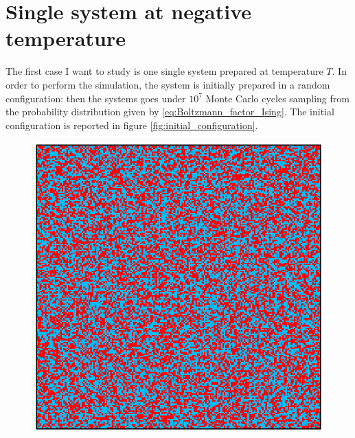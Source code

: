 \section{Single system at negative temperature}
The first case I want to study is one single system prepared at temperature $T$. In order to perform the simulation, the system is initially prepared in a random configuration: then the systems goes under $10^7$ Monte Carlo cycles 
sampling from the probability distribution given by \ref{eq:Boltzmann_factor_Ising}. The initial configuration is reported in figure \ref{fig:initial_configuration}. \\
\begin{figure}
    \centering 
    \begin{minipage}[c]{0.45\textwidth}
        \centering
        \includegraphics[scale=0.38]{./images/ising/initconf.eps}
    \end{minipage}
    \begin{minipage}[c]{0.45\textwidth}
        \centering

\end{minipage}
\end{figure}
